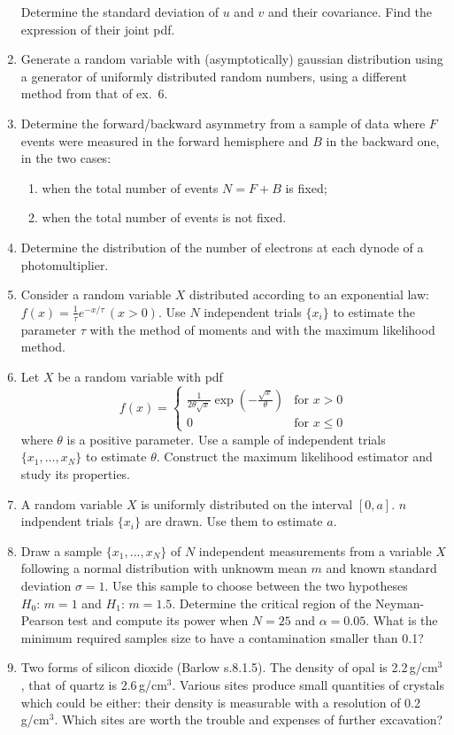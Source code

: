 \documentclass[a4paper,12pt]{article}
\begin{document}
\begin{enumerate}
  Determine the standard deviation of $u$ and $v$ and their covariance. Find the expression of their joint pdf.
  \item Generate a random variable with (asymptotically) gaussian distribution using a generator of uniformly distributed random numbers, using a different method from that of ex.~6.
  \item Determine the forward/backward asymmetry from a sample of data where $F$ events were measured in the forward hemisphere and $B$ in the backward one, in the two cases:
  \begin{enumerate}
   \item when the total number of events $N=F+B$ is fixed;
   \item when the total number of events is not fixed.
  \end{enumerate}
  \item Determine the distribution of the number of electrons at each dynode of a photomultiplier.
  \item Consider a random variable $X$ distributed according to an exponential law: $f(x) = \frac{1}{\tau} e^{-x/\tau}\,(x>0)$. Use $N$ independent trials $\{x_i\}$ to estimate the 
  parameter $\tau$ with the method of moments and with the maximum likelihood method.
  \item Let $X$ be a random variable with pdf 
  $$f(x) = \begin{cases} 
      \frac{1}{2\theta\sqrt{x}}\exp\left(-\frac{\sqrt{x}}{\theta}\right) & \text{for } x>0 \\ 
      0 & \text{for } x \leq 0
   \end{cases}$$
   where $\theta$ is a positive parameter. Use a sample of independent trials $\{x_1, \dots, x_N\}$ to estimate $\theta$. Construct the maximum likelihood estimator and study its properties.
   \item A random variable $X$ is uniformly distributed on the interval $[0,a]$. $n$ indpendent trials $\{x_i\}$ are drawn. Use them to estimate $a$.
   \item Draw a sample $\{x_1, \dots, x_N\}$ of $N$ independent measurements from a variable $X$ following a normal distribution with unknowm mean $m$ and known standard deviation $\sigma=1$. Use this sample to choose between the two hypotheses $H_0:\,m=1$ and $H_1:\,m=1.5$. Determine the critical region of the Neyman-Pearson test and compute its power when
   $N=25$ and $\alpha=0.05$. What is the minimum required samples size to have a contamination smaller than 0.1?
   \item Two forms of silicon dioxide (Barlow s.8.1.5). The density of opal is 2.2\,g/cm$^3$, that of quartz is 2.6\,g/cm$^3$. Various sites produce small quantities of crystals which 
   could be either: their density is measurable with a resolution of 0.2\,g/cm$^3$. Which sites are worth the trouble and expenses of further excavation?
 \end{enumerate}
\end{document}

